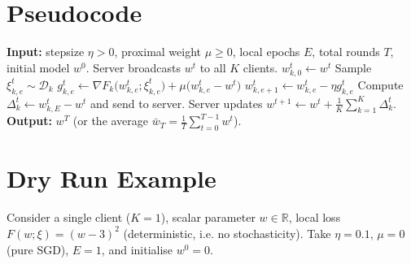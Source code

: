 \documentclass{article}
\newcommand{\RR}{\mathbb{R}}
\begin{document}
\section*{Pseudocode}
\begin{algorithm}[H]
\caption{FedProx (Local SGD with Proximal Term)}
\label{alg:fedprox}
\begin{algorithmic}[1]
\STATE \textbf{Input:} stepsize $\eta>0$, proximal weight $\mu\ge0$, local epochs $E$, total rounds $T$, initial model $w^{0}$.
    \STATE Server broadcasts $w^{t}$ to all $K$ clients.
        \STATE $w^{t}_{k,0}\gets w^{t}$
            \STATE Sample $\xi^{t}_{k,e}\sim\mathcal D_k$
            \STATE $g^{t}_{k,e}\gets \nabla F_k\!\big(w^{t}_{k,e};\xi^{t}_{k,e}\big)+\mu\big(w^{t}_{k,e}-w^{t}\big)$
            \STATE $w^{t}_{k,e+1}\gets w^{t}_{k,e}-\eta g^{t}_{k,e}$
        \ENDFOR
        \STATE Compute $\Delta^{t}_k\gets w^{t}_{k,E}-w^{t}$ and send to server.
    \ENDFOR
    \STATE Server updates $w^{t+1}\gets w^{t}+ \frac1K\sum_{k=1}^{K}\Delta^{t}_k$.
\ENDFOR
\STATE \textbf{Output:} $w^{T}$ (or the average $\bar w_T=\frac1T\sum_{t=0}^{T-1} w^{t}$).
\end{algorithmic}
\end{algorithm}

\section*{Dry Run Example}
Consider a single client ($K=1$), scalar parameter $w\in\RR$, local loss $F(w;\xi)= (w-3)^2$ (deterministic, i.e. no stochasticity).  
Take $\eta=0.1$, $\mu=0$ (pure SGD), $E=1$, and initialise $w^{0}=0$.
\end{document}
